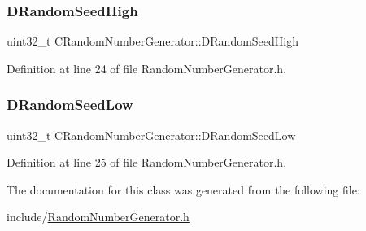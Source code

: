 \subsubsection{\texorpdfstring{D\+Random\+Seed\+High}{DRandomSeedHigh}}
{\footnotesize\ttfamily uint32\+\_\+t C\+Random\+Number\+Generator\+::\+D\+Random\+Seed\+High\hspace{0.3cm}{\ttfamily [protected]}}



Definition at line 24 of file Random\+Number\+Generator.\+h.

\hypertarget{classCRandomNumberGenerator_a33bf3bb9bc1378f4142932a01a3e2cfd}{}\label{classCRandomNumberGenerator_a33bf3bb9bc1378f4142932a01a3e2cfd} 
\subsubsection{\texorpdfstring{D\+Random\+Seed\+Low}{DRandomSeedLow}}
{\footnotesize\ttfamily uint32\+\_\+t C\+Random\+Number\+Generator\+::\+D\+Random\+Seed\+Low\hspace{0.3cm}{\ttfamily [protected]}}



Definition at line 25 of file Random\+Number\+Generator.\+h.



The documentation for this class was generated from the following file\+:\begin{DoxyCompactItemize}
\item 
include/\hyperlink{RandomNumberGenerator_8h}{Random\+Number\+Generator.\+h}\end{DoxyCompactItemize}
